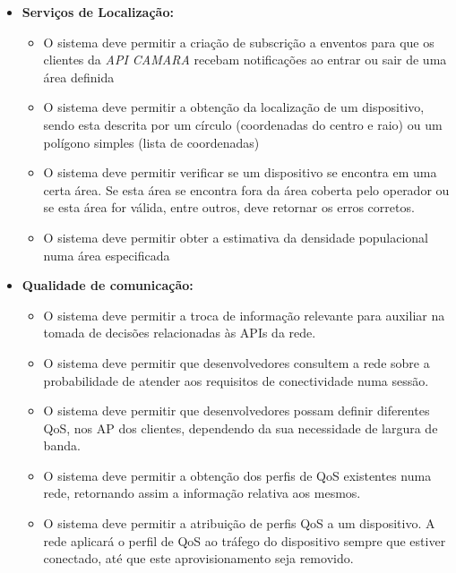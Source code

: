 \begin{itemize} \item \textbf{Serviços de Localização:} \begin{itemize}

		      \item O sistema deve permitir a criação de subscrição a enventos para que os
		            clientes da \emph{API CAMARA} recebam notificações ao entrar ou sair de uma
		            área definida \item O sistema deve permitir a obtenção da localização de um
		            dispositivo, sendo esta descrita por um círculo (coordenadas do centro e
		            raio) ou um polígono simples (lista de coordenadas) \item O sistema deve
		            permitir verificar se um dispositivo se encontra em uma certa área. Se esta
		            área se encontra fora da área coberta pelo operador ou se esta área for
		            válida, entre outros, deve retornar os erros corretos. \item O sistema deve
		            permitir obter a estimativa da densidade populacional numa área especificada
	      \end{itemize}

	\item \textbf{Qualidade de comunicação:} \begin{itemize}

		      \item O sistema deve permitir a troca de informação relevante para auxiliar
		            na tomada de decisões relacionadas às APIs da rede. \item O sistema deve
		            permitir que desenvolvedores consultem a rede sobre a probabilidade de
		            atender aos requisitos de conectividade numa sessão. \item O sistema deve
		            permitir que desenvolvedores possam definir diferentes QoS, nos AP dos
		            clientes, dependendo da sua necessidade de largura de banda. \item O
		            sistema deve permitir a obtenção dos perfis de QoS existentes numa rede,
		            retornando assim a informação relativa aos mesmos. \item O sistema deve
		            permitir a atribuição de perfis QoS a um dispositivo. A rede aplicará o
		            perfil de QoS ao tráfego do dispositivo sempre que estiver conectado, até
		            que este aprovisionamento seja removido. \end{itemize}


\end{itemize}
